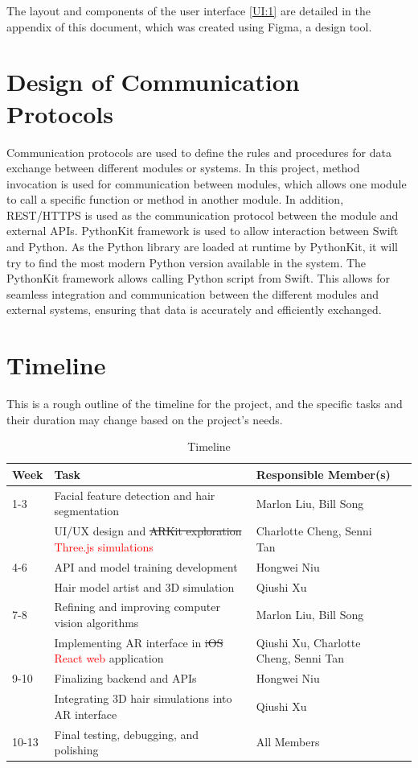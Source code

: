 \documentclass[12pt, titlepage]{article}
\begin{document}
\noindent The layout and components of the user interface \ref{UI:1} are detailed in the appendix of this document, which was created using Figma, a design tool.

\section{Design of Communication Protocols}

Communication protocols are used to define the rules and procedures for data exchange between different modules or systems. In this project, method invocation is used for communication between modules, which allows one module to call a specific function or method in another module. In addition, REST/HTTPS is used as the communication protocol between the module and external APIs. PythonKit framework is used to allow interaction between Swift and Python. As the Python library are loaded at runtime by PythonKit, it will try to find the most modern Python version available in the system. The PythonKit framework allows calling Python script from Swift.
This allows for seamless integration and communication between the different modules and external systems, ensuring that data is accurately and efficiently exchanged.

\section{Timeline}
This is a rough outline of the timeline for the project, and the specific tasks and their duration may change based on the project's needs.

\begin{table}[H]

\begin{tabularx}{\textwidth}{lXXX}
\toprule
\textbf{Week} & \textbf{Task} & \textbf{Responsible Member(s)}\\
\midrule
1-3 & Facial feature detection and hair segmentation & Marlon Liu, Bill Song \\
& UI/UX design and \sout{ARKit exploration} \textcolor{red}{Three.js simulations} & Charlotte Cheng, Senni Tan \\
\midrule
4-6 & API and model training development & Hongwei Niu \\
& Hair model artist and 3D simulation & Qiushi Xu \\
\midrule
7-8 & Refining and improving computer vision algorithms & Marlon Liu, Bill Song \\
& Implementing AR interface in \sout{iOS} \textcolor{red}{React web} application & Qiushi Xu, Charlotte Cheng, Senni Tan  \\
\midrule
9-10 & Finalizing backend and APIs & Hongwei Niu \\
& Integrating 3D hair simulations into AR interface & Qiushi Xu \\
\midrule
10-13 & Final testing, debugging, and polishing & All Members \\
\bottomrule
\bottomrule
\end{tabularx}
\caption{Timeline} \label{TblTimeline}
\end{table}
\end{document}
